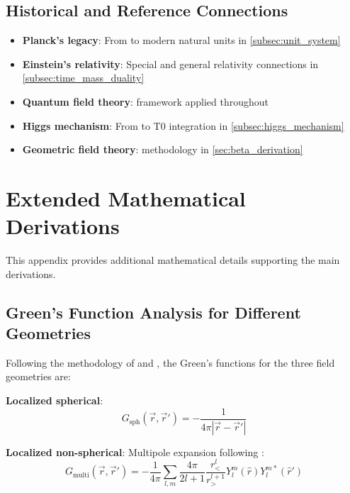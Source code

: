 \documentclass[12pt,a4paper]{article}
\begin{document}
	\subsection{Historical and Reference Connections}
	\label{app:historical_connections}
	
	\begin{itemize}
		\item \textbf{Planck's legacy}: From \citet{planck1900,planck1906} to modern natural units in \cref{subsec:unit_system}
		\item \textbf{Einstein's relativity}: Special \citep{einstein1905} and general \citep{einstein1915} relativity connections in \cref{subsec:time_mass_duality}
		\item \textbf{Quantum field theory}: \citet{weinberg1995,peskin1995} framework applied throughout
		\item \textbf{Higgs mechanism}: From \citet{higgs1964,englert1964} to T0 integration in \cref{subsec:higgs_mechanism}
		\item \textbf{Geometric field theory}: \citet{misner1973} methodology in \cref{sec:beta_derivation}
	\end{itemize}
	
	\section{Extended Mathematical Derivations}
	\label{app:extended_derivations}
	
	This appendix provides additional mathematical details supporting the main derivations.
	
	\subsection{Green's Function Analysis for Different Geometries}
	\label{app:greens_functions}
	
	Following the methodology of \citet{jackson1998} and \citet{duffy2001}, the Green's functions for the three field geometries are:
	
	\textbf{Localized spherical}: 
	\begin{equation}
		G_{\text{sph}}(\vec{r},\vec{r}') = -\frac{1}{4\pi|\vec{r}-\vec{r}'|}
	\end{equation}
	
	\textbf{Localized non-spherical}: Multipole expansion following \citet{jackson1998}:
	\begin{equation}
		G_{\text{multi}}(\vec{r},\vec{r}') = -\frac{1}{4\pi} \sum_{l,m} \frac{4\pi}{2l+1} \frac{r_<^l}{r_>^{l+1}} Y_l^m(\hat{r}) Y_l^{m*}(\hat{r}')
	\end{equation}
	
\end{document}
